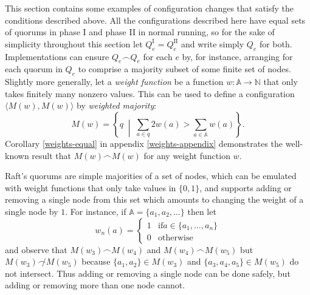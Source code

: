 \documentclass[journal]{IEEEtran}
\begin{document}
This section contains some examples of configuration changes that satisfy the
conditions described above.  All the configurations described here have equal
sets of quorums in phase I and phase II in normal running, so for the sake of
simplicity throughout this section let $Q^\textrm{I}_e = Q^\textrm{II}_e$ and
write simply $Q_e$ for both. Implementations can ensure $Q_e \frown Q_e$ for
each $e$ by, for instance, arranging for each quorum in $Q_e$ to comprise a
majority subset of some finite set of nodes. Slightly more generally, let a
\textit{weight function} be a function $w : \mathbb A \to \mathbb N$ that only
takes finitely many nonzero values. This can be used to define a configuration
$\langle M(w), M(w) \rangle$ by \textit{weighted majority}: \[M(w) = \left\{ q
\;\middle|\; \sum_{a \in q} 2 w(a) > \sum_{a \in \mathbb A} w(a) \right\}.\]
Corollary \ref{weights-equal} in appendix \ref{weights-appendix} demonstrates
the well-known result that $M(w) \frown M(w)$ for any weight function $w$.

\def\maj#1{\mathbf{maj}(#1)}

Raft's quorums are simple majorities of a set of nodes, which can be emulated
with weight functions that only take values in $\{0, 1\}$, and supports adding
or removing a single node from this set which amounts to changing the weight of
a single node by $1$. For instance, if $\mathbb A = \{ a_1, a_2, \ldots \}$
then let \[w_n(a) = \begin{cases} 1 & \mathrm{if } a \in \{a_1, \ldots, a_n\}
\\ 0 & \mathrm{otherwise}\end{cases}\] and observe that ${M(w_3) \frown
M(w_4)}$ and ${M(w_4) \frown M(w_5)}$ but ${M(w_3) \not\frown M(w_5)}$ because
$\{a_1, a_2\} \in M(w_3)$ and $\{a_3, a_4, a_5\} \in M(w_5)$ do not intersect.
Thus adding or removing a single node can be done safely, but adding or
removing more than one node cannot.
\end{document}

